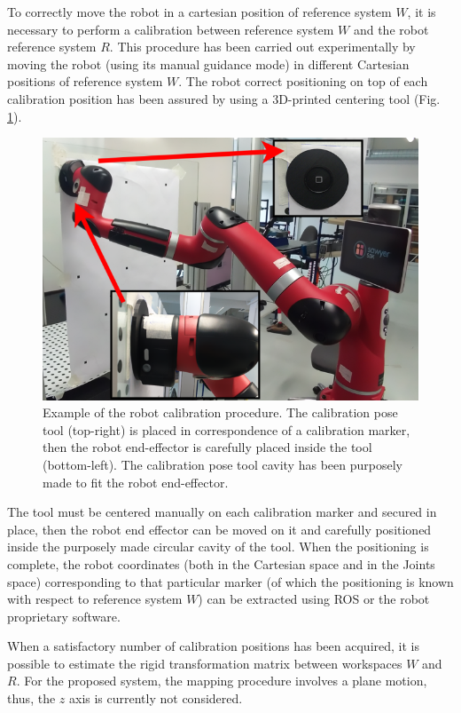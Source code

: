 \documentclass[a4paper, 10pt, conference]{ieeeconf}      %
\begin{document}
To correctly move the robot in a cartesian position of reference system $W$, it is necessary to perform a calibration between reference system $W$ and the robot reference system $R$. This procedure has been carried out experimentally by moving the robot (using its manual guidance mode) in different Cartesian positions of reference system $W$. The robot correct positioning on top of each calibration position has been assured by using a 3D-printed centering tool (Fig. \ref{fig:robotcalib}). 
\begin{figure}[t]
	\centering
	\includegraphics[width=1\columnwidth]{figures/robotcalibration.eps}
	\caption{Example of the robot calibration procedure. The calibration pose tool (top-right) is placed in correspondence of a calibration marker, then the robot end-effector is carefully placed inside the tool (bottom-left). The calibration pose tool cavity has been purposely made to fit the robot end-effector.}
	\label{fig:robotcalib}
\end{figure}
The tool must be centered manually on each calibration marker and secured in place, then the robot end effector can be moved on it and carefully positioned inside the purposely made circular cavity of the tool. When the positioning is complete, the robot coordinates (both in the Cartesian space and in the Joints space) corresponding to that particular marker (of which the positioning is known with respect to reference system $W$) can be extracted using ROS or the robot proprietary software. 

When a satisfactory number of calibration positions has been acquired, it is possible to estimate the rigid transformation matrix between workspaces $W$ and $R$. For the proposed system, the mapping procedure involves a plane motion, thus, the $z$ axis is currently not considered.
\end{document}
